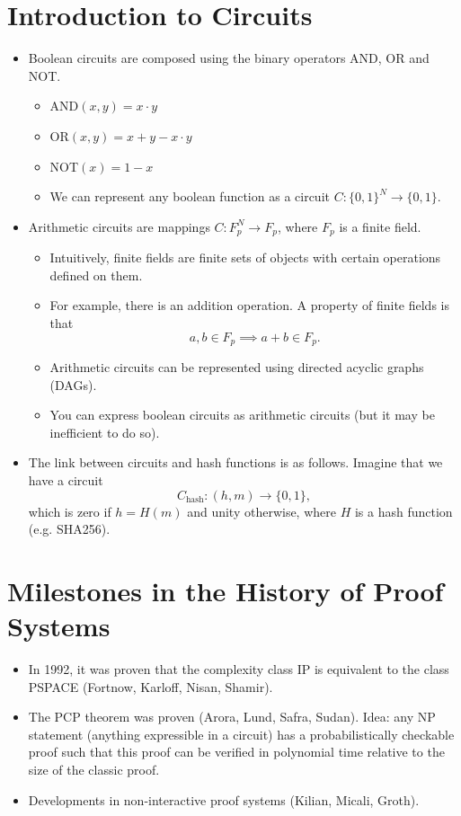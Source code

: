 \documentclass{article}
\begin{document}
\section{Introduction to Circuits}
\begin{itemize}
\item Boolean circuits are composed using the binary operators AND, OR and NOT.
	\begin{itemize}
	\item AND$(x, y) = x\cdot y$
	\item OR$(x, y) = x+y-x\cdot y$
	\item NOT$(x) = 1-x$ 
	\item We can represent any boolean function as a circuit $C: \{0,1\}^N \longrightarrow \{0,1\}$.
	\end{itemize}
\item Arithmetic circuits are mappings $C: F_p^N \longrightarrow F_p$, where $F_p$ is a finite field.
	\begin{itemize}
	\item Intuitively, finite fields are finite sets of objects with certain operations defined on them.
	\item For example, there is an addition operation. A property of finite fields is that
		\begin{equation}
		a, b \in F_p \implies a+b \in F_p.
		\end{equation}
	\item Arithmetic circuits can be represented using directed acyclic graphs (DAGs).
	\item You can express boolean circuits as arithmetic circuits (but it may be inefficient to do so).
	\end{itemize}
\item The link between circuits and hash functions is as follows. Imagine that we have a circuit
	\begin{equation}
	C_{\text{hash}}: (h, m) \longrightarrow \{0,1\},
	\end{equation}
	which is zero if $h=H(m)$ and unity otherwise, where $H$ is a hash function (e.g. SHA256).
\end{itemize}

\section{Milestones in the History of Proof Systems}
\begin{itemize}
\item In 1992, it was proven that the complexity class IP is equivalent to the class PSPACE (Fortnow, Karloff, Nisan, Shamir).
\item The PCP theorem was proven (Arora, Lund, Safra, Sudan). Idea: any NP statement (anything expressible in a circuit) has a probabilistically checkable proof such that this proof can be verified in polynomial time relative to the size of the classic proof.
\item Developments in non-interactive proof systems (Kilian, Micali, Groth).
\end{itemize}
\end{document}
